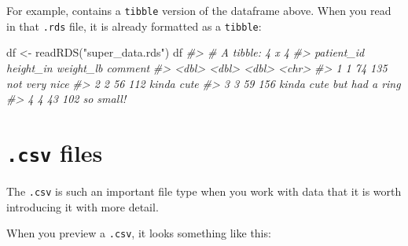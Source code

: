 \documentclass[
]{book}
\newenvironment{Shaded}{\begin{snugshade}}{\end{snugshade}}
\newcommand{\CommentTok}[1]{\textcolor[rgb]{0.56,0.35,0.01}{\textit{#1}}}
\newcommand{\FunctionTok}[1]{\textcolor[rgb]{0.00,0.00,0.00}{#1}}
\newcommand{\NormalTok}[1]{#1}
\newcommand{\OtherTok}[1]{\textcolor[rgb]{0.56,0.35,0.01}{#1}}
\newcommand{\StringTok}[1]{\textcolor[rgb]{0.31,0.60,0.02}{#1}}
\begin{document}
For example, contains a \texttt{tibble} version of the dataframe above. When you read in that \texttt{.rds} file, it is already formatted as a \texttt{tibble}:

\begin{Shaded}
\begin{Highlighting}[]
\NormalTok{df }\OtherTok{\textless{}{-}} \FunctionTok{readRDS}\NormalTok{(}\StringTok{"super\_data.rds"}\NormalTok{)}
\NormalTok{df}
\CommentTok{\#\textgreater{} \# A tibble: 4 x 4}
\CommentTok{\#\textgreater{}   patient\_id height\_in weight\_lb comment                  }
\CommentTok{\#\textgreater{}        \textless{}dbl\textgreater{}     \textless{}dbl\textgreater{}     \textless{}dbl\textgreater{} \textless{}chr\textgreater{}                    }
\CommentTok{\#\textgreater{} 1          1        74       135 not very nice            }
\CommentTok{\#\textgreater{} 2          2        56       112 kinda cute               }
\CommentTok{\#\textgreater{} 3          3        59       156 kinda cute but had a ring}
\CommentTok{\#\textgreater{} 4          4        43       102 so small!}
\end{Highlighting}
\end{Shaded}

\hypertarget{csv-files}{%
\section*{\texorpdfstring{\texttt{.csv} files}{.csv files}}\label{csv-files}}

The \texttt{.csv} is such an important file type when you work with data that it is worth introducing it with more detail.

When you preview a \texttt{.csv}, it looks something like this:
\end{document}
